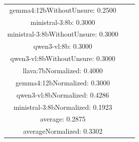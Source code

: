 \documentclass[a4paper]{article}
\begin{document}
\begin{tabular}{ccc}
gemma4:12bWithoutUnsure: 0.2500 \\ ministral-3:8b: 0.3000 \\ ministral-3:8bWithoutUnsure: 0.3000 \\ qwen3-vl:8b: 0.3000 \\ qwen3-vl:8bWithoutUnsure: 0.3000 \\ llava:7bNormalized: 0.4000 \\ gemma4:12bNormalized: 0.3000 \\ qwen3-vl:8bNormalized: 0.4286 \\ ministral-3:8bNormalized: 0.1923 \\ average: 0.2875 \\ averageNormalized: 0.3302 \end{minipage}\\
\end{tabular}

\vspace{5mm}
\end{document}
